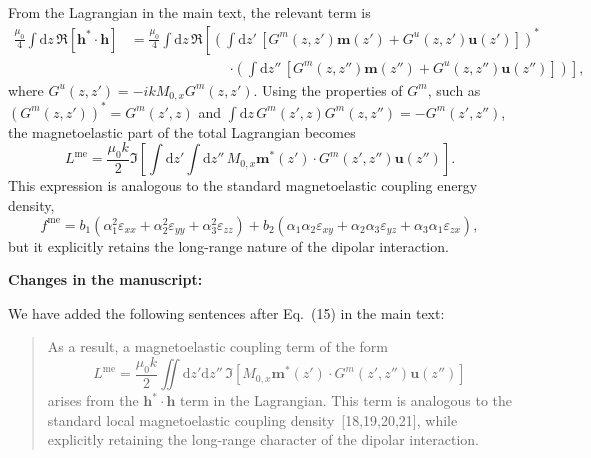 \documentclass[11pt]{revtex4-2}
\newcommand{\ManuscriptChangeHeader}{\par\vspace{0.4em}\noindent\textbf{Changes in the manuscript:}\par\noindent}
\begin{document}
From the Lagrangian in the main text, the relevant term is
\begin{align*}
    \frac{\mu_0}{4}\int\mathrm{d} z\,\Re\left[\bm{h}^*\cdot\bm{h}\right]
    &=
    \frac{\mu_0}{4}\int\mathrm{d} z\,
    \Re\left[
    \left(
    \int\mathrm{d}z'\,
    \left[
    G^m(z,z')\bm{m}(z')
    +
    G^u(z,z')\bm{u}(z')
    \right]
    \right)^*\right.\\
    &\hspace{3cm}\left.\cdot
    \left(
    \int\mathrm{d}z''\,
    \left[
    G^m(z,z'')\bm{m}(z'')
    +
    G^u(z,z'')\bm{u}(z'')
    \right]
    \right)
    \right],
\end{align*}
where $G^u(z,z')=-ikM_{0,x}G^m(z,z')$. Using the properties of $G^m$, such as
$\left(G^m(z,z')\right)^*=G^m(z',z)$ and
$\int\mathrm{d}z\,G^m(z',z)G^m(z,z'')=-G^m(z',z'')$,
the magnetoelastic part of the total Lagrangian becomes
\begin{equation*}
    L^{\mathrm{me}}
    =
    \frac{\mu_0 k}{2}
    \Im\left[
    \int\mathrm{d} z'\int\mathrm{d} z''\,
    M_{0,x}\bm{m}^*(z')\cdot G^m(z',z'')\bm{u}(z'')
    \right].
\end{equation*}
This expression is analogous to the standard magnetoelastic coupling energy density,
\begin{equation*}
    f^{\mathrm{me}}
    =
    b_1\left(
    \alpha_1^2\varepsilon_{xx}
    +
    \alpha_2^2\varepsilon_{yy}
    +
    \alpha_3^2\varepsilon_{zz}
    \right)
    +
    b_2\left(
    \alpha_1\alpha_2\varepsilon_{xy}
    +
    \alpha_2\alpha_3\varepsilon_{yz}
    +
    \alpha_3\alpha_1\varepsilon_{zx}
    \right),
\end{equation*}
but it explicitly retains the long-range nature of the dipolar interaction.

\ManuscriptChangeHeader
We have added the following sentences after Eq.~(15) in the main text:

\begin{quote}
As a result, a magnetoelastic coupling term of the form
\begin{equation}
    L^{\mathrm{me}}
    =
    \frac{\mu_0 k}{2}
    \iint\mathrm{d}z'\mathrm{d}z''\,
    \Im\left[
    M_{0,x}\bm{m}^*(z')\cdot G^m(z',z'')\bm{u}(z'')
    \right]\nonumber
\end{equation}
arises from the $\bm{h}^*\cdot\bm{h}$ term in the Lagrangian. This term is analogous to the standard local magnetoelastic coupling density~[18,19,20,21], while explicitly retaining the long-range character of the dipolar interaction.
\end{quote}
\end{document}
